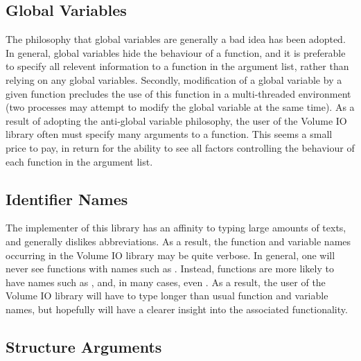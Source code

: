 \subsection{Global Variables}

The philosophy that global variables are generally a bad idea has been
adopted.  In general, global variables hide the behaviour of a
function, and it is preferable to specify all relevent information to
a function in the argument list, rather than relying on any global
variables.  Secondly, modification of a global variable by a given function
precludes the use of this function in a multi-threaded environment
(two processes may attempt to modify the global variable at the same
time).  As a result of adopting the anti-global variable philosophy, the
user of the Volume IO library often must specify
many arguments to a function.  This seems a small price to pay, in
return for the ability to see all factors controlling
the behaviour of each function in the argument list.

\subsection{Identifier Names}

The implementer of this library has an affinity to typing large
amounts of texts, and generally dislikes abbreviations.  As a result,
the function and variable names occurring in the Volume IO library may
be quite verbose.  In general, one will never see functions with names
such as .  Instead, functions are more likely to have
names such as , and, in many cases, even
.  As a result, the user of the Volume IO
library will have to type longer than usual function and variable
names, but hopefully will have a clearer insight into the associated
functionality.

\subsection{Structure Arguments}

